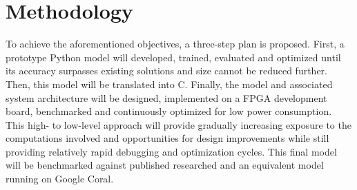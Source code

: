 \documentclass[12pt]{article}
\begin{document}
\section{Methodology}
To achieve the aforementioned objectives, a three-step plan is proposed. First, a prototype Python model will developed, trained, evaluated and optimized until its accuracy surpasses existing solutions and size cannot be reduced further. Then, this model will be translated into C. Finally, the model and associated system architecture will be designed, implemented on a FPGA development board, benchmarked and continuously optimized for low power consumption. This high- to low-level approach will provide gradually increasing exposure to the computations involved and opportunities for design improvements while still providing relatively rapid debugging and optimization cycles. This final model will be benchmarked against published researched and an equivalent model running on Google Coral.

\newpage
\printbibliography

\newpage
\end{document}
